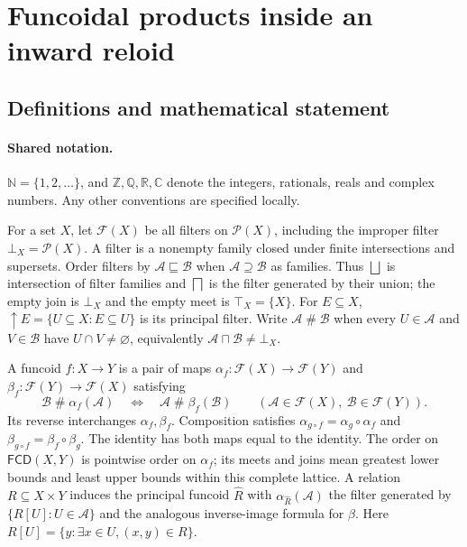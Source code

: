 \documentclass[11pt]{article}
\begin{document}
\section{Funcoidal products inside an inward reloid}\label{statement}

\subsection{Definitions and mathematical statement}

\paragraph{Shared notation.}$\mathbb N=\{1,2,\ldots\}$, and $\mathbb Z,\mathbb Q,\mathbb R,\mathbb C$ denote the integers, rationals, reals and complex numbers. Any other conventions are specified locally.


For a set $X$, let $\mathcal F(X)$ be all filters on $\mathcal P(X)$, including the improper filter $\bot_X=\mathcal P(X)$. A filter is a nonempty family closed under finite intersections and supersets. Order filters by $\mathcal A\sqsubseteq\mathcal B$ when $\mathcal A\supseteq\mathcal B$ as families. Thus $\bigsqcup$ is intersection of filter families and $\bigsqcap$ is the filter generated by their union; the empty join is $\bot_X$ and the empty meet is $\top_X=\{X\}$. For $E\subseteq X$, $\uparrow E=\{U\subseteq X:E\subseteq U\}$ is its principal filter. Write $\mathcal A\mathrel{\#}\mathcal B$ when every $U\in\mathcal A$ and $V\in\mathcal B$ have $U\cap V\ne\varnothing$, equivalently $\mathcal A\sqcap\mathcal B\ne\bot_X$.

A funcoid $f:X\to Y$ is a pair of maps $\alpha_f:\mathcal F(X)\to\mathcal F(Y)$ and $\beta_f:\mathcal F(Y)\to\mathcal F(X)$ satisfying
\[
 \mathcal B\mathrel{\#}\alpha_f(\mathcal A)
 \quad\Longleftrightarrow\quad
 \mathcal A\mathrel{\#}\beta_f(\mathcal B)
 \qquad(\mathcal A\in\mathcal F(X),\ \mathcal B\in\mathcal F(Y)).
\]
Its reverse interchanges $\alpha_f,\beta_f$. Composition satisfies $\alpha_{g\circ f}=\alpha_g\circ\alpha_f$ and $\beta_{g\circ f}=\beta_f\circ\beta_g$. The identity has both maps equal to the identity. The order on $\mathsf{FCD}(X,Y)$ is pointwise order on $\alpha_f$; its meets and joins mean greatest lower bounds and least upper bounds within this complete lattice. A relation $R\subseteq X\times Y$ induces the principal funcoid $\widehat R$ with $\alpha_{\widehat R}(\mathcal A)$ the filter generated by $\{R[U]:U\in\mathcal A\}$ and the analogous inverse-image formula for $\beta$. Here $R[U]=\{y:\exists x\in U,(x,y)\in R\}$.
\end{document}
